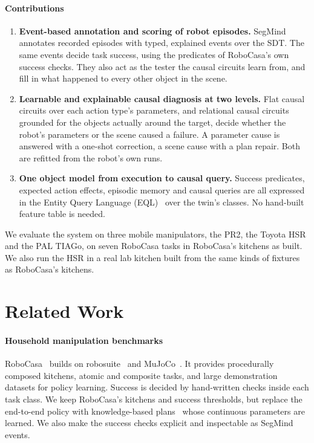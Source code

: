 \documentclass[letterpaper, 10 pt, conference]{ieeeconf}
\newcommand{\robocasa}{RoboCasa}
\newcommand{\segmind}{SegMind}
\newcommand{\eql}{EQL}
\newcommand{\sdt}{SDT}
\begin{document}
\paragraph*{Contributions}
\begin{enumerate}
  \item \textbf{Event-based annotation and scoring of robot episodes.}
        \segmind{} annotates recorded episodes with typed, explained events over
        the \sdt{}. The same events decide task success, using the predicates of
        \robocasa{}'s own success checks. They also act as the tester the causal
        circuits learn from, and fill in what happened to every other object in
        the scene.
  \item \textbf{Learnable and explainable causal diagnosis at two levels.}
        Flat causal circuits over each action type's parameters, and relational
        causal circuits grounded for the objects actually around the target,
        decide whether the robot's parameters or the scene caused a failure. A
        parameter cause is answered with a one-shot correction, a scene cause
        with a plan repair. Both are refitted from the robot's own runs.
  \item \textbf{One object model from execution to causal query.} Success
        predicates, expected action effects, episodic memory and causal queries
        are all expressed in the Entity Query Language (\eql{})~\cite{bassiouny2026krrood}
        over the twin's classes. No hand-built feature table is needed.
\end{enumerate}

We evaluate the system on three mobile manipulators, the PR2, the Toyota HSR
and the PAL TIAGo, on seven \robocasa{} tasks in \robocasa{}'s kitchens as
built. We also run the HSR in a real lab kitchen built from the same kinds of
fixtures as \robocasa{}'s kitchens.

\section{Related Work}
\label{sec:related-work}

\paragraph*{Household manipulation benchmarks}
\robocasa{}~\cite{nasiriany2024robocasa} builds on
robosuite~\cite{zhu2020robosuite} and MuJoCo~\cite{todorov2012mujoco}. It
provides procedurally composed kitchens, atomic and composite tasks, and large
demonstration datasets for policy learning. Success is decided by hand-written
checks inside each task class. We keep \robocasa{}'s kitchens and success
thresholds, but replace the end-to-end policy with knowledge-based
plans~\cite{beetz2010cram} whose continuous parameters are learned. We also
make the success checks explicit and inspectable as \segmind{} events.
\end{document}
